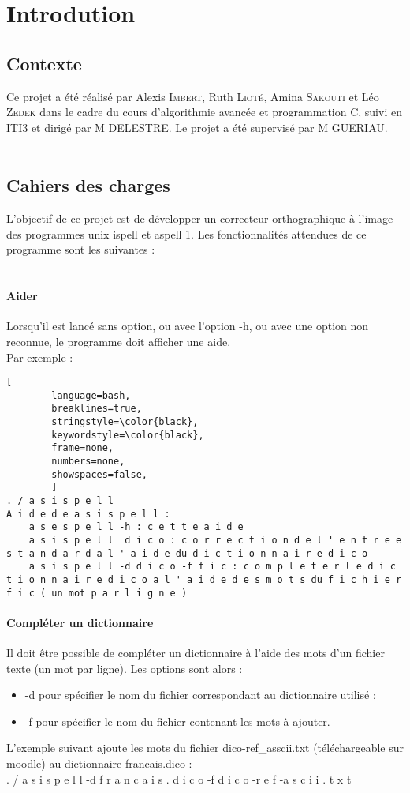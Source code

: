 \section{Introdution}
\subsection{Contexte}
Ce projet a été réalisé par Alexis \textsc{Imbert}, Ruth \textsc{Lioté}, Amina \textsc{Sakouti} et Léo \textsc{Zedek} 
dans le cadre du cours d'algorithmie avancée et programmation C, suivi en ITI3 et dirigé par M DELESTRE. 
Le projet a été supervisé par M GUERIAU.\\
\\
\subsection{Cahiers des charges}
L'objectif de ce projet est de développer un correcteur orthographique à l'image des programmes unix ispell et aspell 1. 
Les fonctionnalités attendues de ce programme sont les suivantes :\\
\\
\paragraph{Aider}
Lorsqu'il est lancé sans option, ou avec l'option -h, ou avec une option non reconnue, le programme doit afficher une aide.\\
Par exemple :
\begin{lstlisting}[
		language=bash,
		breaklines=true,
		stringstyle=\color{black},
		keywordstyle=\color{black},
		frame=none,
		numbers=none,
		showspaces=false,
		]
. / a s i s p e l l
A i d e d e a s i s p e l l :
	a s e s p e l l -h : c e t t e a i d e
	a s i s p e l l	 d i c o : c o r r e c t i o n d e l ' e n t r e e s t a n d a r d a l ' a i d e du d i c t i o n n a i r e d i c o
	a s i s p e l l -d d i c o -f f i c : c o m p l e t e r l e d i c t i o n n a i r e d i c o a l ' a i d e d e s m o t s du f i c h i e r f i c ( un mot p a r l i g n e )
\end{lstlisting}
\paragraph{Compléter un dictionnaire}
Il doit être possible de compléter un dictionnaire à l'aide des mots d'un fichier texte (un mot par ligne). Les options sont alors :
\begin{itemize}
\item -d pour spécifier le nom du fichier correspondant au dictionnaire utilisé ;
\item -f pour spécifier le nom du fichier contenant les mots à ajouter.
\end{itemize}
L'exemple suivant ajoute les mots du fichier dico-ref\_asscii.txt (téléchargeable sur moodle) au dictionnaire francais.dico :\\
. / a s i s p e l l -d f r a n c a i s . d i c o -f d i c o -r e f -a s c i i . t x t\\
\\
